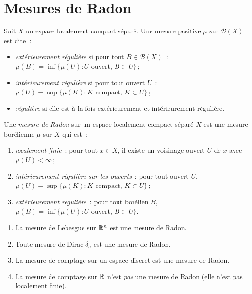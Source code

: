 \section{Mesures de Radon}

\begin{definition}
\label{def:reguliere}
Soit $X$ un espace localement compact s\'epar\'e. Une mesure positive $\mu$ sur
$\mathcal{B}(X)$ est dite~:
\begin{itemize}
    \item \emph{ext\'erieurement r\'eguli\`ere}
    si pour tout $B \in \mathcal{B}(X)$~:
    $\mu(B) = \inf\{\mu(U) : U \text{ ouvert},\, B \subset U\}$\,;
    \item \emph{int\'erieurement r\'eguli\`ere}
    si pour tout ouvert $U$~:
    $\mu(U) = \sup\{\mu(K) : K \text{ compact},\, K \subset U\}$\,;
    \item \emph{r\'eguli\`ere} si elle est \`a la fois ext\'erieurement et
    int\'erieurement r\'eguli\`ere.
\end{itemize}
\end{definition}

\begin{definition}
\label{def:radon}
Une \emph{mesure de Radon} sur un espace localement compact s\'epar\'e $X$ est une
mesure bor\'elienne $\mu$ sur $X$ qui est~:
\begin{enumerate}
    \item[(i)] \emph{localement finie}~: pour tout $x \in X$, il existe un voisinage
    ouvert $U$ de $x$ avec $\mu(U) < \infty$\,;
    \item[(ii)] \emph{int\'erieurement r\'eguli\`ere sur les ouverts}~: pour tout
    ouvert $U$, $\mu(U) = \sup\{\mu(K) : K \text{ compact},\, K \subset U\}$\,;
    \item[(iii)] \emph{ext\'erieurement r\'eguli\`ere}~: pour tout bor\'elien $B$,
    $\mu(B) = \inf\{\mu(U) : U \text{ ouvert},\, B \subset U\}$.
\end{enumerate}
\end{definition}

\begin{exemple}
\begin{enumerate}
    \item La mesure de Lebesgue sur $\mathbb{R}^n$ est une mesure de Radon.
    \item Toute mesure de Dirac $\delta_a$ est une mesure de Radon.
    \item La mesure de comptage sur un espace discret est une mesure de Radon.
    \item La mesure de comptage sur $\mathbb{R}$ n'est \emph{pas} une mesure de Radon
    (elle n'est pas localement finie).
\end{enumerate}
\end{exemple}


